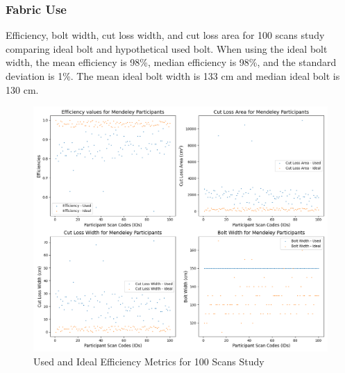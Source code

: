 \subsubsection{Fabric Use}
Efficiency, bolt width, cut loss width, and cut loss area for 100 scans study comparing ideal bolt and hypothetical used bolt.
When using the ideal bolt width, the mean efficiency is 98\%, median efficiency is 98\%, and the standard deviation is 1\%. The mean ideal bolt width is 133 cm and median ideal bolt is 130 cm.
\begin{figure} [H] %
    \centering %
    \includegraphics[width = \textwidth]{Images/Mendeley_Plot.png} %
    \caption{Used and Ideal Efficiency Metrics for 100 Scans Study}
\end{figure}


